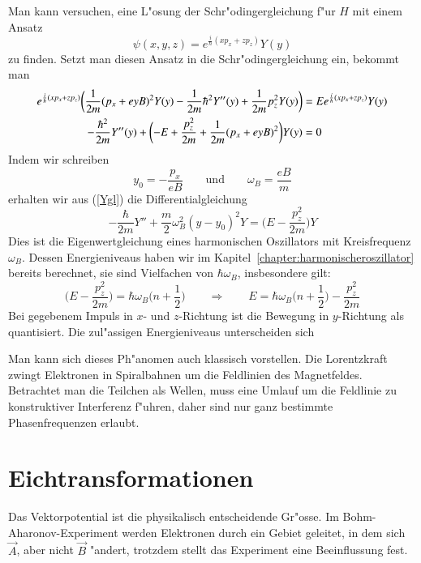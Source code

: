 Man kann versuchen, eine L"osung der Schr"odingergleichung f"ur $H$ mit
einem Ansatz
\[
\psi(x,y,z)
=
e^{\frac{i}{\hbar}(xp_x+zp_z)}Y(y)
\]
zu finden.
Setzt man diesen Ansatz in die Schr"odingergleichung ein, bekommt man
\begin{align}
e^{\frac{i}{\hbar}(xp_x+zp_z)}
\biggl(
\frac1{2m}
(p_x+eyB)^2
Y(y)
-
\frac1{2m}
\hbar^2 Y''(y)
+
\frac1{2m}p_z^2
Y(y)
\biggr)
&=
E
e^{\frac{i}{\hbar}(xp_x+zp_z)}
Y(y)
\notag
\\
-\frac{\hbar^2}{2m} Y''(y)
+
\biggl(
-E
+
\frac{ p_z^2}{2m}
+
\frac1{2m}
(p_x+eyB)^2
\biggr)
Y(y)
&=
0
\label{Ygl}
\end{align}
Indem wir schreiben
\[
y_0=-\frac{p_x}{eB}
\qquad
\text{und}
\qquad
\omega_B
=\frac{eB}{m}
\]
erhalten wir aus (\ref{Ygl}) die Differentialgleichung
\begin{equation}
-\frac{\hbar}{2m}Y''
+\frac{m}2\omega_B^2(y-y_0)^2Y
=
\biggl(E-\frac{p_z^2}{2m}\biggr) Y
\label{landauniveaus}
\end{equation}
Dies ist die Eigenwertgleichung eines harmonischen Oszillators mit
Kreisfrequenz $\omega_B$.
Dessen Energieniveaus haben wir im Kapitel~\ref{chapter:harmonischeroszillator}
bereits berechnet, sie sind Vielfachen von $\hbar\omega_B$, insbesondere
gilt:
\[
\biggl(E-\frac{p_z^2}{2m}\biggr) = \hbar\omega_B\biggl(n+\frac12\biggr)
\qquad\Rightarrow\qquad
E=
\hbar\omega_B\biggl(n+\frac12\biggr)
-
\frac{p_z^2}{2m}
\]
Bei gegebenem Impuls in $x$- und $z$-Richtung ist die Bewegung in
$y$-Richtung als quantisiert.
Die zul"assigen Energieniveaus unterscheiden sich 

Man kann sich dieses Ph"anomen auch klassisch vorstellen.
Die Lorentzkraft zwingt Elektronen in Spiralbahnen um die Feldlinien des
Magnetfeldes.
Betrachtet man die Teilchen als Wellen, muss eine Umlauf um die
Feldlinie zu konstruktiver Interferenz f"uhren, daher sind nur
ganz bestimmte Phasenfrequenzen erlaubt.

%
%
\section{Eichtransformationen}
Das Vektorpotential ist die physikalisch entscheidende Gr"osse.
Im Bohm-Aharonov-Experiment
werden Elektronen durch ein Gebiet geleitet, in dem sich $\vec A$,
aber nicht $\vec B$ "andert, trotzdem stellt das Experiment eine
Beeinflussung fest.

